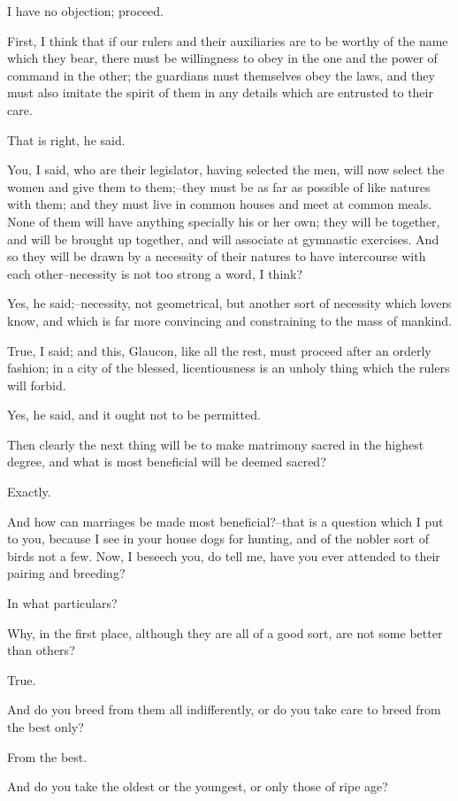 I have no objection; proceed.

First, I think that if our rulers and their auxiliaries are to be worthy
of the name which they bear, there must be willingness to obey in the
one and the power of command in the other; the guardians must themselves
obey the laws, and they must also imitate the spirit of them in any
details which are entrusted to their care.

That is right, he said.

You, I said, who are their legislator, having selected the men, will now
select the women and give them to them;--they must be as far as possible
of like natures with them; and they must live in common houses and meet
at common meals. None of them will have anything specially his or her
own; they will be together, and will be brought up together, and
will associate at gymnastic exercises. And so they will be drawn by
a necessity of their natures to have intercourse with each
other--necessity is not too strong a word, I think?

Yes, he said;--necessity, not geometrical, but another sort of necessity
which lovers know, and which is far more convincing and constraining to
the mass of mankind.

True, I said; and this, Glaucon, like all the rest, must proceed after
an orderly fashion; in a city of the blessed, licentiousness is an
unholy thing which the rulers will forbid.

Yes, he said, and it ought not to be permitted.

Then clearly the next thing will be to make matrimony sacred in the
highest degree, and what is most beneficial will be deemed sacred?

Exactly.

And how can marriages be made most beneficial?--that is a question which
I put to you, because I see in your house dogs for hunting, and of the
nobler sort of birds not a few. Now, I beseech you, do tell me, have you
ever attended to their pairing and breeding?

In what particulars?

Why, in the first place, although they are all of a good sort, are not
some better than others?

True.

And do you breed from them all indifferently, or do you take care to
breed from the best only?

From the best.

And do you take the oldest or the youngest, or only those of ripe age?

